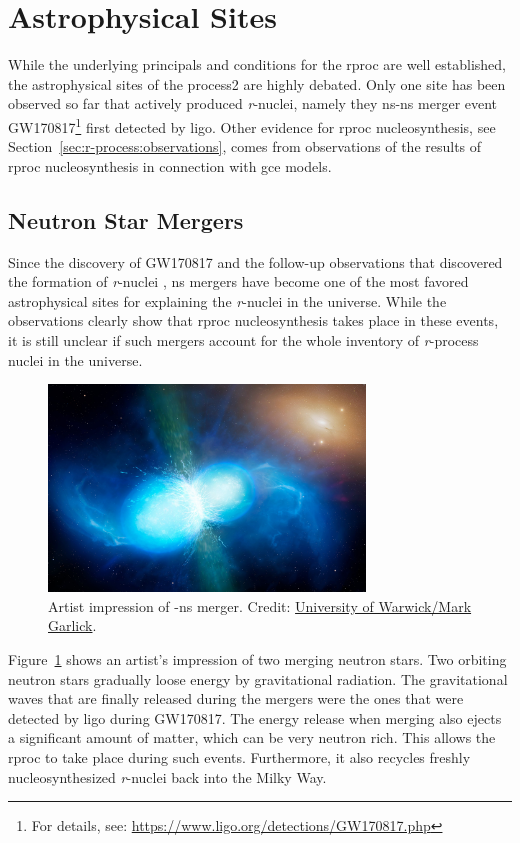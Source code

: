\section{Astrophysical Sites}

While the underlying principals and conditions for the \ac{rproc} are well established, the astrophysical sites of the process2 are highly debated. Only one site has been observed so far that actively produced \textit{r}-nuclei, namely they \ac{ns}-\ac{ns} merger event GW170817\footnote{For details, see: \url{https://www.ligo.org/detections/GW170817.php}} first detected by \ac{ligo}. Other evidence for \ac{rproc} nucleosynthesis, see Section~\ref{sec:r-process:observations}, comes from observations of the results of \ac{rproc} nucleosynthesis in connection with \ac{gce} models. 

\subsection{Neutron Star Mergers}

Since the discovery of GW170817 and the follow-up observations that discovered the formation of \textit{r}-nuclei \citep{pian17}, \ac{ns} mergers have become one of the most favored astrophysical sites for explaining the \textit{r}-nuclei in the universe. While the observations clearly show that \ac{rproc} nucleosynthesis takes place in these events, it is still unclear if such mergers account for the whole inventory of \textit{r}-process nuclei in the universe.

\begin{figure}[tb]
    \centering
    \includegraphics[width=0.75\textwidth]{graphics/r-process/ns-merger}
    \caption{Artist impression of -\ac{ns} merger. Credit: \href{https://www.eso.org/public/images/eso1733s/}{University of Warwick/Mark Garlick}.}
    \label{fig:r-process:ns-merger}
\end{figure}
Figure~\ref{fig:r-process:ns-merger} shows an artist's impression of two merging neutron stars. Two orbiting neutron stars gradually loose energy by gravitational radiation. The gravitational waves that are finally released during the mergers were the ones that were detected by \ac{ligo} during GW170817. The energy release when merging also ejects a significant amount of matter, which can be very neutron rich. This allows the \ac{rproc} to take place during such events. Furthermore, it also recycles freshly nucleosynthesized \textit{r}-nuclei back into the Milky Way.

